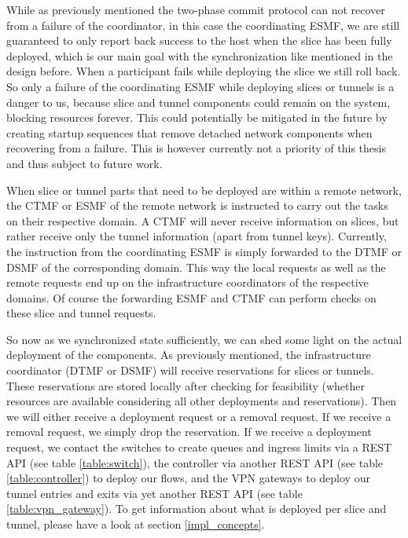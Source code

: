 While as previously mentioned the two-phase commit protocol can not recover from a failure of the coordinator, in this case the coordinating ESMF, we are still guaranteed to only report back success to the host when the slice has been fully deployed, which is our main goal with the synchronization like mentioned in the design before. When a participant fails while deploying the slice we still roll back. So only a failure of the coordinating ESMF while deploying slices or tunnels is a danger to us, because slice and tunnel components could remain on the system, blocking resources forever. This could potentially be mitigated in the future by creating startup sequences that remove detached network components when recovering from a failure. This is however currently not a priority of this thesis and thus subject to future work.

When slice or tunnel parts that need to be deployed are within a remote network, the CTMF or ESMF of the remote network is instructed to carry out the tasks on their respective domain. A CTMF will never receive information on slices, but rather receive only the tunnel information (apart from tunnel keys). Currently, the instruction from the coordinating ESMF is simply forwarded to the DTMF or DSMF of the corresponding domain. This way the local requests as well as the remote requests end up on the infrastructure coordinators of the respective domains. Of course the forwarding ESMF and CTMF can perform checks on these slice and tunnel requests.

So now as we synchronized state sufficiently, we can shed some light on the actual deployment of the components. As previously mentioned, the infrastructure coordinator (DTMF or DSMF) will receive reservations for slices or tunnels. These reservations are stored locally after checking for feasibility (whether resources are available considering all other deployments and reservations). Then we will either receive a deployment request or a removal request. If we receive a removal request, we simply drop the reservation. If we receive a deployment request, we contact the switches to create queues and ingress limits via a REST API (see table \ref{table:switch}), the controller via another REST API (see table \ref{table:controller}) to deploy our flows, and the VPN gateways to deploy our tunnel entries and exits via yet another REST API (see table \ref{table:vpn_gateway}). To get information about what is deployed per slice and tunnel, please have a look at section \ref{impl_concepts}.

